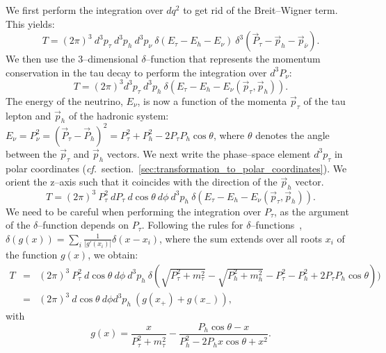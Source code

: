 We first perform the integration over $dq^2$ to get rid of the Breit--Wigner term. 
This yields:
\begin{equation*}
T = (2\pi)^3 \ d^3p_{\tau} \ d^3p_{h} \ d^3p_{\nu} \ \delta(E_{\tau} - E_{h} - E_{\nu}) \ \delta^3(\vec{P}_{\tau} - \vec{p}_{h} - \vec{p}_{\bar{\nu}}).
\end{equation*}
We then use the 3--dimensional $\delta$--function that represents the momentum conservation in the tau decay to perform the integration over $d^3P_{\nu}$:
\begin{equation*}
T = (2\pi)^3 d^3p_{\tau} \ d^3p_{h} \ \delta(E_{\tau} - E_{h} - E_{\nu}(\vec{p}_{\tau}, \vec{p}_{h})). 
\end{equation*}
The energy of the neutrino, $E_{\nu}$, is now a function of the momenta $\vec{p}_{\tau}$ of the tau lepton and $\vec{p}_{h}$ of the hadronic system:
$E_{\nu} = P_{\nu}^2 = (\vec{P}_{\tau} - \vec{P}_{h})^2 = P_{\tau}^2 + P_{h}^2 - 2 P_{\tau} P_{h} \cos\theta$,
where $\theta$ denotes the angle between the $\vec{p}_{\tau}$ and $\vec{p}_{h}$ vectors.
We next write the phase--space element $d^3p_{\tau}$ in polar coordinates ({\it cf.}\ section.~\ref{sec:transformation_to_polar_coordinates}).
We orient the z--axis such that it coincides with the direction of the $\vec{p}_{h}$ vector.
\begin{equation*}
T = (2\pi)^3 \ P_{\tau}^2 \ dP_{\tau} \ d\cos\theta \ d\phi \ d^3p_{h} \ \delta(E_{\tau} - E_{h} - E_{\nu}(\vec{p}_{\tau}, \vec{p}_{h})). 
\end{equation*}
We need to be careful when performing the integration over $P_{\tau}$, as the argument of the $\delta$--function depends on $P_{\tau}$.
Following the rules for $\delta$--functions~\cite{deltaFunctionRules}, $\delta(g(x)) = \sum_{i} \frac{1}{\vert g'(x_i) \vert} \delta(x - x_{i})$,
where the sum extends over all roots $x_{i}$ of the function $g(x)$, we obtain:
\begin{eqnarray}
T & = & (2\pi)^3 \ P_{\tau}^2 \ d\cos\theta \ d\phi \ d^3p_{h} \ \delta(\sqrt{P_{\tau}^2 + m_{\tau}^2} - \sqrt{P_{h}^2 + m_{h}^2} - P_{\tau}^2 - P_{h}^2 + 2 P_{\tau} P_{h} \cos\theta)) \nonumber \\
  & = & (2\pi)^3 \ d\cos\theta \ d\phi d^3p_{h} \ \left( g(x_{+}) + g(x_{-}) \right),
\label{eq:tauBlock}
\end{eqnarray}
with 
\begin{equation*}
g(x) = \frac{x}{P_{\tau}^2 + m_{\tau}^2} - \frac{P_{h} \cos\theta - x}{P_{h}^2 - 2 P_{h} x \cos\theta + x^2}.
\end{equation*}
